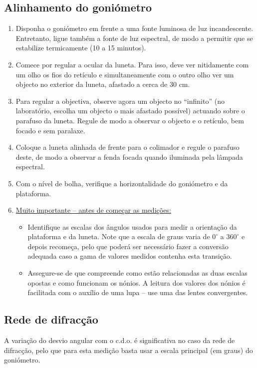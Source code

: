 \documentclass[12pt,a4paper,oneside]{paper}
\begin{document}
\subsection*{\sf Alinhamento do goniómetro}
\begin{enumerate}
\item Disponha o goniómetro em frente a uma fonte luminosa de luz incandescente. Entretanto, ligue também a fonte de luz
espectral, de modo a permitir que se estabilize termicamente (10 a 15 minutos).
\item Comece por regular a ocular da luneta. Para isso, deve ver nitidamente com um olho  os fios do retículo e simultaneamente
com o outro olho ver um objecto no exterior da luneta, afastado a cerca de 30 cm.  
\item Para  regular  a  objectiva,  observe  agora  um  objecto  no  “infinito” (no  laboratório, escolha  um objecto o mais
afastado possível)  actuando  sobre  o  parafuso  da  luneta.  Regule  de  modo  a observar o objecto e o retículo, bem focado
e sem paralaxe. 
\item Coloque  a  luneta  alinhada de frente  para o  colimador  e  regule o parafuso deste, de modo a observar a fenda
focada quando iluminada pela lâmpada espectral. 
\item Com o nível de bolha, verifique a horizontalidade do goniómetro e da plataforma.
\item \underline{Muito importante -- antes de começar as medições:} 
\begin{itemize}
\item Identifique as escalas dos ângulos usados para medir a orientação da plataforma e da luneta. Note que a escala de graus
varia de $0^\circ$ a $360^\circ$ e depois recomeça, pelo que poderá ser necessário fazer a conversão adequada caso a gama de
valores medidos contenha esta transição. 
\item Assegure-se de que compreende como estão relacionadas as duas escalas opostas e como funcionam os nónios. A leitura
dos valores dos nónios é facilitada com o auxílio de uma lupa -- use uma das lentes convergentes.
\end{itemize}
\end{enumerate}

\subsection*{\sf Rede de difracção}
A variação do desvio angular com o c.d.o. é significativa no caso da rede de difracção, pelo que para esta medição basta
usar a escala principal (em graus) do goniómetro.
\end{document}
